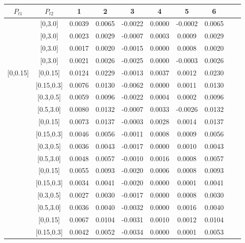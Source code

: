 \begin{table}[H]\scriptsize
\centering
\begin{tabular}{|c| c| c| c| c| c| c| c| c| c|}
\hline
$P_{t1}$ & $P_{t2}$ & 1 & 2 & 3 & 4& 5& 6 \\ \hline
[0,0.15]	&	[0,3.0]	&	0.0039	&	0.0065	&	-0.0022	&	0.0000	&	-0.0002	&	0.0065	\\ \hline
[0.15,0.3]	&	[0,3.0]	&	0.0023	&	0.0029	&	-0.0007	&	0.0003	&	0.0009	&	0.0029	\\ \hline
[0.3,0.5]	&	[0,3.0]	&	0.0017	&	0.0020	&	-0.0015	&	0.0000	&	0.0008	&	0.0020	\\ \hline
[0.5,3.0]	&	[0,3.0]	&	0.0021	&	0.0026	&	-0.0025	&	0.0000	&	-0.0003	&	0.0026	\\ \hline
															
[0,0.15]	&	[0,0.15]	&	0.0124	&	0.0229	&	-0.0013	&	0.0037	&	0.0012	&	0.0230	\\ \hline
[0,0.15]	&	[0.15,0.3]	&	0.0076	&	0.0130	&	-0.0062	&	0.0000	&	0.0011	&	0.0130	\\ \hline
[0,0.15]	&	[0.3,0.5]	&	0.0059	&	0.0096	&	-0.0022	&	0.0004	&	0.0002	&	0.0096	\\ \hline
[0,0.15]	&	[0.5,3.0]	&	0.0080	&	0.0132	&	-0.0007	&	0.0033	&	-0.0026	&	0.0132	\\ \hline
[0.15,0.3]	&	[0,0.15]	&	0.0073	&	0.0137	&	-0.0003	&	0.0028	&	0.0014	&	0.0137	\\ \hline
[0.15,0.3]	&	[0.15,0.3]	&	0.0046	&	0.0056	&	-0.0011	&	0.0008	&	0.0009	&	0.0056	\\ \hline
[0.15,0.3]	&	[0.3,0.5]	&	0.0036	&	0.0043	&	-0.0017	&	0.0000	&	0.0010	&	0.0043	\\ \hline
[0.15,0.3]	&	[0.5,3.0]	&	0.0048	&	0.0057	&	-0.0010	&	0.0016	&	0.0008	&	0.0057	\\ \hline
[0.3,0.5]	&	[0,0.15]	&	0.0055	&	0.0093	&	-0.0020	&	0.0006	&	0.0008	&	0.0093	\\ \hline
[0.3,0.5]	&	[0.15,0.3]	&	0.0034	&	0.0041	&	-0.0020	&	0.0000	&	0.0001	&	0.0041	\\ \hline
[0.3,0.5]	&	[0.3,0.5]	&	0.0027	&	0.0030	&	-0.0017	&	0.0000	&	0.0008	&	0.0030	\\ \hline
[0.3,0.5]	&	[0.5,3.0]	&	0.0036	&	0.0040	&	-0.0032	&	0.0000	&	0.0016	&	0.0040	\\ \hline
[0.5,3.0]	&	[0,0.15]	&	0.0067	&	0.0104	&	-0.0031	&	0.0010	&	0.0012	&	0.0104	\\ \hline
[0.5,3.0]	&	[0.15,0.3]	&	0.0042	&	0.0052	&	-0.0034	&	0.0000	&	0.0001	&	0.0053	\\ \hline

\end{tabular}
\end{table}
